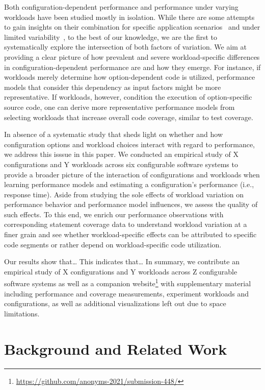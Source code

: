 Both configuration-dependent performance and performance under varying workloads have been studied mostly in isolation. While there are some attempts to gain insights on their combination for specific application scenarios~\cite{alves_sampling_2020} and under limited variability~\cite{liao_2020_using_emse}, to the best of our knowledge, we are the first to systematically explore the intersection of both factors of variation. We aim at providing a clear picture of how prevalent and severe workload-specific differences in configuration-dependent performance are and how they emerge. For instance, if workloads merely determine how option-dependent code is utilized, performance models that consider this dependency as input factors might be more representative. If workloads, however, condition the execution of option-specific source code, one can derive more representative performance models from selecting workloads that increase overall code coverage, similar to test coverage.

In absence of a systematic study that sheds light on whether and how configuration options and workload choices interact with regard to performance, we address this isssue in this paper. We conducted an empirical study of X configurations and Y workloads across six configurable software systems to provide a broader picture of the interaction of configurations and workloads when learning performance models and estimating a configuration's performance (i.e., response time). Aside from studying the sole effects of workload variation on performance behavior and performance model influences, we assess the quality of such effects. To this end, we enrich our performance observations with corresponding statement coverage data to understand workload variation at a finer grain and see whether workload-specific effects can be attributed to specific code segments or rather depend on workload-specific code utilization.

{\color{red}Our results show that… This indicates that… In summary, we contribute an empirical study of X configurations and Y workloads across Z configurable software systems as well as a companion website\footnote{\url{https://github.com/anonyms-2021/submission-448/}} with supplementary material including performance and coverage measurements, experiment workloads and configurations, as well as additional visualizations left out due to space limitations.}


\section{Background and Related Work}

